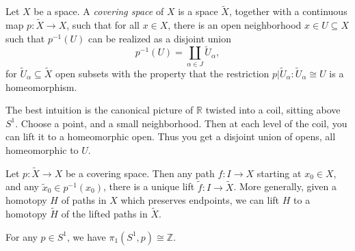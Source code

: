 



\begin{definition}\label{dfn:covering-space}
	Let $X$ be a space. A \emph{covering space} of $X$ is a space $\widetilde{X} $, together with a continuous map $p : \widetilde{X}  \to X$, such that for all $x\in X$, there is an open neighborhood $x\in U \subseteq X$ such that $p ^{-1} (U)$ can be realized as a disjoint union
	\[
		p ^{-1} (U) = \coprod_{\alpha \in J} \widetilde{U}_\alpha ,
	\]
	for $\widetilde{U} _\alpha \subseteq \widetilde{X} $ open subsets with the property that the restriction $p|\widetilde{U}_\alpha : \widetilde{U} _\alpha \cong U$ is a homeomorphism.
\end{definition}

\begin{intuition}
	The best intuition is the canonical picture of $\mathbb{R} $ twisted into a coil, sitting above $S^1$. Choose a point, and a small neighborhood. Then at each level of the coil, you can lift it to a homeomorphic open. Thus you get a disjoint union of opens, all homeomorphic to $U$.
\end{intuition}

\begin{lemma}\label{lma:covering-space-lifts}
	Let $p : \widetilde{X}  \to X$ be a covering space. Then any path $f : I \to X$ starting at $x_0\in X$, and any $\widetilde{x} _0\in p ^{-1} (x_0)$, there is a unique lift $\widetilde{f} : I \to \widetilde{X} $. More generally, given a homotopy $H$ of paths in $X$ which preserves endpoints, we can lift $H$ to a homotopy $\widetilde{H} $ of the lifted paths in $\widetilde{X} $.
\end{lemma}

\begin{theorem}\label{thm:fundamental-group-of-s1}
	For any $p\in S^1$, we have $\pi _1(S^1,p)\cong \mathbb{Z} $.
\end{theorem}


